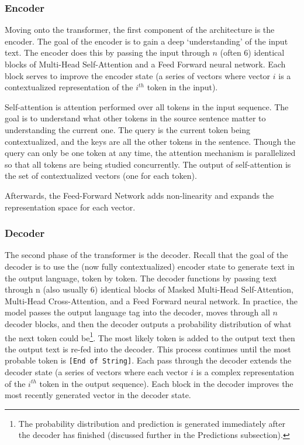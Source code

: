 \subsubsection{Encoder}
Moving onto the transformer, the first component of the architecture is the encoder. The goal of the encoder is to gain a deep ‘understanding’ of the input text. The encoder does this by passing the input through $n$ (often 6) identical blocks of Multi-Head Self-Attention and a Feed Forward neural network. Each block serves to improve the encoder state (a series of vectors where vector $i$ is a contextualized representation of the $i^{th}$ token in the input).

Self-attention is attention performed over all tokens in the input sequence. The goal is to understand what other tokens in the source sentence matter to understanding the current one. The query is the current token being contextualized, and the keys are all the other tokens in the sentence. Though the query can only be one token at any time, the attention mechanism is parallelized so that all tokens are being studied concurrently. The output of self-attention is the set of contextualized vectors (one for each token).

Afterwards, the Feed-Forward Network adds non-linearity and expands the representation space for each vector.

\subsubsection{Decoder}
The second phase of the transformer is the decoder. Recall that the goal of the decoder is to use the (now fully contextualized) encoder state to generate text in the output language, token by token. The decoder functions by passing text through n (also usually 6) identical blocks of Masked Multi-Head Self-Attention, Multi-Head Cross-Attention, and a Feed Forward neural network. In practice, the model passes the output language tag into the decoder, moves through all $n$ decoder blocks, and then the decoder outputs a probability distribution of what the next token could be\footnote{The probability distribution and prediction is generated immediately after the decoder has finished (discussed further in the Predictions subsection).}. The most likely token is added to the output text then the output text is re-fed into the decoder. This process continues until the most probable token is \texttt{[End of String]}. Each pass through the decoder extends the decoder state (a series of vectors where each vector $i$ is a complex representation of the $i^{th}$ token in the output sequence). Each block in the decoder improves the most recently generated vector in the decoder state.

